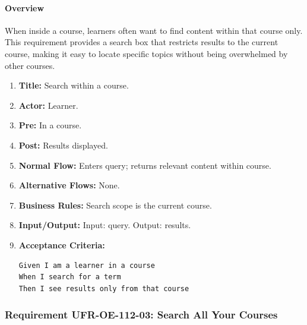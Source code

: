 \paragraph{Overview}
When inside a course, learners often want to find content within that course only. This requirement provides a search box that restricts results to the current course, making it easy to locate specific topics without being overwhelmed by other courses.
\begin{enumerate}[label=\textbf{\arabic*.}]
\item \textbf{Title:} Search within a course.
\item \textbf{Actor:} Learner.
\item \textbf{Pre:} In a course.
\item \textbf{Post:} Results displayed.
\item \textbf{Normal Flow:} Enters query; returns relevant content within course.
\item \textbf{Alternative Flows:} None.
\item \textbf{Business Rules:} Search scope is the current course.
\item \textbf{Input/Output:} Input: query. Output: results.
\item \textbf{Acceptance Criteria:}
    \begin{verbatim}
Given I am a learner in a course
When I search for a term
Then I see results only from that course
    \end{verbatim}
\end{enumerate}

\subsubsection{Requirement UFR-OE-112-03: Search All Your Courses}
